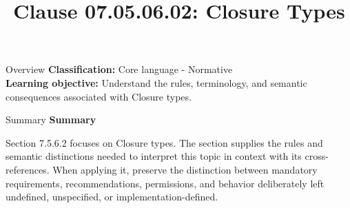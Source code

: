 \documentclass[10pt,letterpaper]{article}
\title{Clause 07.05.06.02: Closure Types}
\author{}
\date{}
\begin{document}
\maketitle
\begin{CornellOverviewBox}{Overview}
\textbf{Classification:} Core language - Normative\\[2pt]
\textbf{Learning objective:} Understand the rules, terminology, and semantic consequences associated with Closure types.
\end{CornellOverviewBox}\begin{CornellSummaryBox}{Summary}
{\sffamily\bfseries\color{Accent} Summary}\par\vspace{3pt}Section 7.5.6.2 focuses on Closure types. The section supplies the rules and semantic distinctions needed to interpret this topic in context with its cross-references. When applying it, preserve the distinction between mandatory requirements, recommendations, permissions, and behavior deliberately left undefined, unspecified, or implementation-defined.
\end{CornellSummaryBox}
\end{document}
